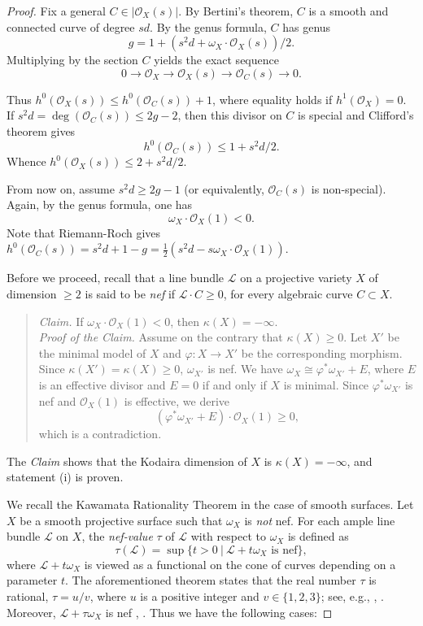 \documentclass[a4, 11pt]{amsart}
\theoremstyle{plain}
\theoremstyle{definition}
\newcommand{\enm}[1]{\ensuremath{#1}}          %
\newcommand{\cal}[1]{\mathcal{#1}}
\newcommand{\Ll}{\enm{\cal{L}}}
\newcommand{\Oo}{\enm{\cal{O}}}
\renewcommand{\phi}{\varphi}
\renewcommand{\to}[1][]{\xrightarrow{\ #1\ }}
\begin{document}
\begin{proof}
Fix a general $C\in |\Oo _X(s)|$. By Bertini's theorem, $C$ is a smooth and connected curve of degree $sd$. By the genus formula, $C$ has genus 
\[
g = 1 + (s^2d + \omega _X\cdot \Oo _X(s))/2. 
\]
Multiplying by the section $C$ yields the exact sequence 
\begin{equation}\label{eqma1}
0 \to \Oo _X\to \Oo _X(s)\to \Oo _C(s)\to 0.
\end{equation}

Thus $h^0(\Oo _X(s)) \le h^0(\Oo _C(s)) +1$, where equality holds if $h^1(\Oo _X)=0$. \\
If $s^2d = \deg (\Oo _C(s)) \le 2g-2$, then this divisor on $C$ is special and Clifford's theorem \cite[pp. 107--108]{acgh} gives 
\[
h^0(\Oo _C(s)) \le 1 +s^2d/2. 
\]
Whence $h^0(\Oo _X(s))\le 2 +s^2d/2$.

From now on, assume $s^2d\ge 2g-1$ (or equivalently, $\Oo _C(s)$ is non-special). Again, by the genus formula, one has 
\[
\omega _X \cdot \Oo _X(1) <0.
\] 
Note that Riemann-Roch gives $h^0(\Oo _C(s)) =s^2d +1-g = \frac{1}{2}(s^2d -s\omega _X\cdot \Oo _X(1))$.

Before we proceed, recall that a line bundle $\mathcal L$ on a projective variety $X$ of dimension $\ge 2$ is said to be \emph{nef} if $\mathcal L \cdot C\ge 0$, for every algebraic curve $C\subset X$. 
\begin{quote}
{\it Claim.} If $\omega _X \cdot \Oo _X(1) <0$, then $\kappa (X)=-\infty$. \\
{\it Proof of the Claim.} Assume on the contrary that $\kappa (X)\ge 0$. Let $X'$ be the minimal model of $X$ and $\phi: X\to X'$ be the corresponding morphism. Since $\kappa (X') =\kappa (X)\ge 0$, $\omega _{X'}$ is nef. We have $\omega _X \cong \phi^\ast\omega _{X'} +E$, where $E$ is an effective divisor and $E = 0$ if and only if $X$ is minimal. Since $\phi^\ast\omega _{X'}$ is nef and $\Oo_X(1)$ is effective, we derive 
\[
( \phi^\ast \omega _{X'} +E)\cdot \Oo _X(1)\ge 0,
\]
which is a contradiction. 
\end{quote}
The {\it Claim} shows that the Kodaira dimension of $X$ is $\kappa (X) = -\infty$, and statement (i) is proven. 

We recall the Kawamata Rationality Theorem in the case of smooth surfaces. Let $X$ be a smooth projective surface such that $\omega _X$ is {\it not} nef. For each ample line bundle $\Ll$ on $X$, the {\it nef-value} $\tau$ of $\Ll$ with respect to $\omega_X$ is defined as 
\[
\tau(\Ll) = \sup \lbrace t>0 \ | \  \Ll +t\omega _X \mbox{ is nef} \rbrace, 
\]
where  $\Ll +t\omega _X$ is viewed as a functional on the cone of curves depending on a parameter $t$. The aforementioned theorem states that the real number $\tau$ is rational, $\tau = u/v$, where $u$ is a positive integer and $v\in \{1,2,3\}$; see, e.g., \cite[Theorem 1.5.2]{bs}, \cite[Corollary 1-2-15]{matsuki}. Moreover, $\Ll +\tau \omega_X$ is nef \cite[Lemma 1.5.5]{bs}, \cite[Theorem 1-2-14]{matsuki}. Thus
we have the following cases:


\end{proof}
\end{document}
